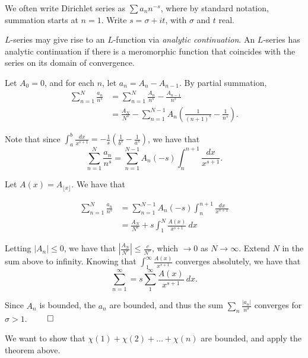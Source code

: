 \documentclass[a4paper, 12pt,oneside,openany]{book}
\begin{document}
We often write Dirichlet series as $\sum a_n n^{-s}$, where by standard notation, summation starts at $n=1$. Write $s=\sigma + it$, with $\sigma$ and $t$ real. 

$L$-series may give rise to an $L$-function via \emph{analytic continuation}. An $L$-series has analytic continuation if there is a meromorphic function that coincides with the series on its domain of convergence.


 Let $A_0=0$, and for each $n$, let $a_n=A_n-A_{n-1}$. By partial summation, 
\begin{align*} 
	\sum\limits_{n=1}^N \frac{a_n}{n^s} &= \sum\limits_{n=1}^N \frac{A_n}{n^s} - \frac{A_{n-1}}{n^s} \\
	&= \frac{A_N}{N^s} - \sum\limits_{n=1}^{N-1} A_n \left(\frac{1}{(n+1)^s}-\frac{1}{n^s}\right).
\end{align*}

Note that since $\int_a^b \frac{dx}{x^{s+1}}=-\frac{1}{s}(\frac{1}{b^s}-\frac{1}{a^s})$, we have that $$\sum\limits_{n=1}^N \frac{a_n}{n^s}=\sum\limits_{n=1}^{N-1} A_n(-s) \int_n^{n+1} \frac{dx}{x^{s+1}}.$$

Let $A(x) = A_{\lfloor x \rfloor}.$ We have that 

\begin{align*}
	\sum\limits_{n=1}^N \frac{a_n}{n^s}&=\sum\limits_{n=1}^{N-1} A_n(-s) \int_n^{n+1} \frac{dx}{x^{s+1}}\\
	&= \frac{A_N}{N^s}+s\int_1^N \frac{A(x)}{x^{s+1}}\ dx
\end{align*}

Letting $|A_n| \leq 0$, we have that $\left| \frac{A_N}{N^s}\right| \leq \frac{c}{N^{\sigma}}$, which $\to 0$ as $N\to \infty$. Extend $N$ in the sum above to infinity. Knowing that $\int_1^\infty \frac{A(x)}{x^{s+1}}$ converges absolutely, we have that $$\sum\limits_{n=1}^\infty = s\sum_1^\infty \frac{A(x)}{x^{s+1}}\ dx.$$

Since $A_n$ is bounded, the $a_n$ are bounded, and thus the sum $\sum\limits_n \frac{|a_n|}{n^\sigma}$ converges for $\sigma >1$. $\qed$


 We want to show that $\chi(1)+\chi(2)+\dots+\chi(n)$ are bounded, and apply the theorem above.
\end{document}
